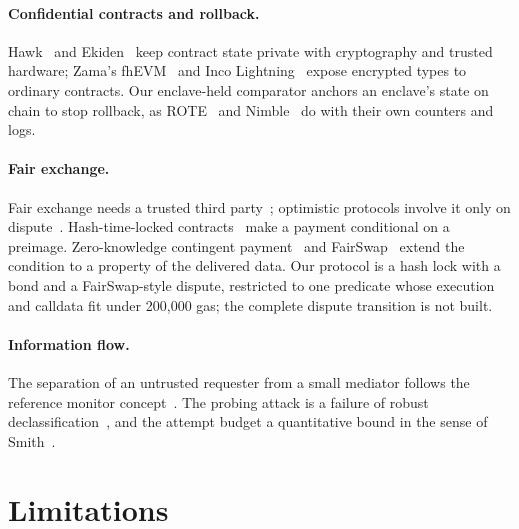 \paragraph{Confidential contracts and rollback.} Hawk~\cite{hawk} and Ekiden~\cite{ekiden} keep contract state private with cryptography and trusted hardware;
Zama's fhEVM~\cite{fhevm} and Inco Lightning~\cite{inco} expose encrypted types to ordinary contracts. Our enclave-held comparator anchors an enclave's state on
chain to stop rollback, as ROTE~\cite{rote} and Nimble~\cite{nimble} do with their own counters and logs.

\paragraph{Fair exchange.} Fair exchange needs a trusted third party~\cite{pagnia1999}; optimistic protocols involve it only on dispute~\cite{asokan1998}.
Hash-time-locked contracts~\cite{lightning} make a payment conditional on a preimage. Zero-knowledge contingent payment~\cite{maxwell2016,campanelli2017} and
FairSwap~\cite{fairswap} extend the condition to a property of the delivered data. Our protocol is a hash lock with a bond and a FairSwap-style dispute,
restricted to one predicate whose execution and calldata fit under 200{,}000 gas; the complete dispute transition is not built.

\paragraph{Information flow.} The separation of an untrusted requester from a small mediator follows the reference monitor concept~\cite{anderson}. The
probing attack is a failure of robust declassification~\cite{zdancewic2001}, and the attempt budget a quantitative bound in the sense of
Smith~\cite{smith2009}.

\section{Limitations}
\label{sec:limits}

